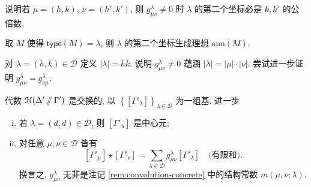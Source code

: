 \begin{exercise}
	说明若 $\mu = (h,k)$, $\nu = (h',k')$, 则 $g^\lambda_{\mu\nu} \neq 0$ 时 $\lambda$ 的第二个坐标必是 $k, k'$ 的公倍数.
	
	\begin{hint}
		取 $M$ 使得 $\mathsf{type}(M) = \lambda$, 则 $\lambda$ 的第二个坐标生成理想 $\mathrm{ann}(M)$.
	\end{hint}
\end{exercise}

\begin{exercise}
	对 $\lambda = (h,k) \in \mathcal{D}$ 定义 $|\lambda| = hk$. 说明 $g^\lambda_{\mu\nu} \neq 0$ 蕴涵 $|\lambda| = |\mu| \cdot |\nu|$. 尝试进一步证明 $g^\lambda_{\mu\nu} = g^\lambda_{\nu\mu}$.
\end{exercise}

\begin{theorem}\label{prop:Hall-Hecke}
	代数 $\EuScript{H}(\Delta' \sslash \Gamma')$ 是交换的, 以 $\left\{ \left[ \Gamma'_\lambda \right] \right\}_{ \lambda \in \mathcal{D}}$ 为一组基. 进一步
	\begin{enumerate}[(i)]
		\item 若 $\lambda = (d,d) \in \mathcal{D}$, 则 $[\Gamma'_\lambda]$ 是中心元;
		\item 对任意 $\mu, \nu \in \mathcal{D}$ 皆有
		\[ [\Gamma'_\mu] \star [\Gamma'_\nu] = \sum_{\lambda \in \mathcal{D}} g^\lambda_{\mu\nu} [\Gamma'_\lambda] \quad \text{(有限和)}. \]
		换言之, $g^\lambda_{\mu\nu}$ 无非是注记 \ref{rem:convolution-concrete} 中的结构常数 $m(\mu, \nu; \lambda)$.
	\end{enumerate}
\end{theorem}
